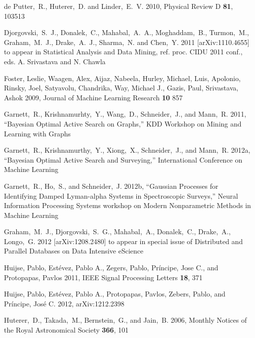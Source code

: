 \documentclass[useAMS,usenatbib,tightenlines,11pt,preprint]{aastex}
\begin{document}
\begin{thebibliography}{99}
de Putter,~R., Huterer,~D. and Linder,~E.~V. 2010, Physical Review D {\bf 81},
103513


Djorgovski,~S.~J., Donalek,~C., Mahabal,~A.~A., Moghaddam,~B., Turmon,~M.,
Graham,~M.~J., Drake,~A.~J., Sharma,~N. and Chen,~Y. 2011
[arXiv:1110.4655] to appear in Statistical Analysis and Data Mining, ref. proc.
CIDU 2011 conf., eds. A. Srivastava and N. Chawla

Foster, Leslie, Waagen, Alex, Aijaz, Nabeela, Hurley, Michael, Luis, Apolonio,
Rinsky, Joel, Satyavolu, Chandrika, Way, Michael J., Gazis, Paul, Srivastava,
Ashok 2009, Journal of Machine Learning Research {\bf 10} 857

Garnett,~R., Krishnamurhty,~Y., Wang,~D., Schneider,~J., and Mann,~R. 2011,
``Bayesian Optimal Active Search on Graphs,'' KDD Workshop on Mining and
Learning with Graphs

Garnett,~R., Krishnamurthy,~Y., Xiong,~X., Schneider,~J., and Mann,~R. 2012a,
``Bayesian Optimal Active Search and Surveying,'' International Conference on
Machine Learning

Garnett,~R., Ho,~S., and Schneider,~J. 2012b,
``Gaussian Processes for Identifying Damped Lyman-alpha Systems in Spectroscopic
Surveys,'' Neural Information Processing Systems 
workshop on Modern Nonparametric Methods in Machine Learning

Graham,~M.~J., Djorgovski,~S.~G., Mahabal,~A., Donalek,~C., Drake,~A.,
Longo,~G. 2012 [arXiv:1208.2480] to appear in special issue of Distributed and
Parallel Databases on Data Intensive eScience

Huijse, Pablo, Est\'evez, Pablo A., Zegers, Pablo, Pr\'incipe, Jose C.,
and Protopapas, Pavlos 2011, IEEE Signal Processing Letters {\bf 18}, 371

Huijse, Pablo, Est\'evez, Pablo A., Protopapas, Pavlos, Zebers, Pablo,
and Pr\'incipe, Jos\'e C. 2012, arXiv:1212.2398

Huterer,~D., Takada,~M., Bernstein,~G., and Jain,~B. 2006,
Monthly Notices of the Royal Astronomical Society {\bf 366}, 101


\end{thebibliography}
\end{document}
